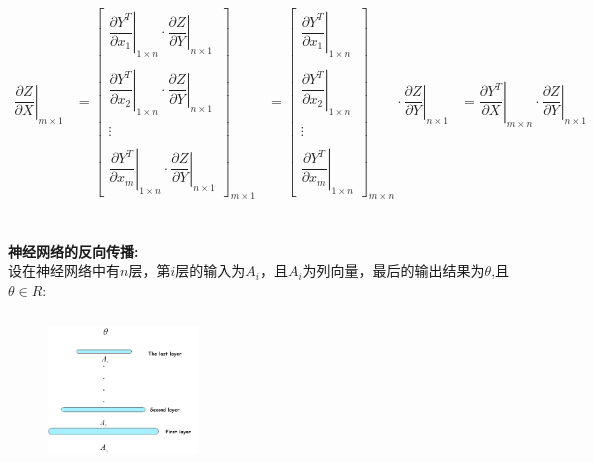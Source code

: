 \documentclass[withoutpreface,bwprint]{cumcmthesis} %
\begin{document}
	\begin{align*}
		\left. \dfrac{\partial Z}{\partial X} \right|_{m{\times}1}
		&=
		\left[
		\begin{array}{c}
			\left. \dfrac{\partial Y^T}{\partial x_1} \right|_{1{\times}n} 
			\cdot
			\left. \dfrac{\partial Z}{\partial Y} \right|_{n{\times}1}
			\\\\
			\left. \dfrac{\partial Y^T}{\partial x_2} \right|_{1{\times}n} 
			\cdot
			\left. \dfrac{\partial Z}{\partial Y} \right|_{n{\times}1}
			\\\\
			\vdots \\\\
			\left. \dfrac{\partial Y^T}{\partial x_m} \right|_{1{\times}n} 
			\cdot
			\left. \dfrac{\partial Z}{\partial Y} \right|_{n{\times}1}
		\end{array}
		\right]_{m{\times}1}	
		&=
		\left[
		\begin{array}{c}
			\left. \dfrac{\partial Y^T}{\partial x_1} \right|_{1{\times}n} 
			\\\\
			\left. \dfrac{\partial Y^T}{\partial x_2} \right|_{1{\times}n} 
			\\\\
			\vdots \\\\
			\left. \dfrac{\partial Y^T}{\partial x_m} \right|_{1{\times}n} 
		\end{array}
		\right]_{m{\times}n}
		\cdot
		 \left. \dfrac{\partial Z}{\partial Y} \right|_{n{\times}1}
		&=\left. \dfrac{\partial Y^T}{\partial X} \right|_{m{\times}n} \cdot \left. \dfrac{\partial Z}{\partial Y} \right|_{n{\times}1}
	\end{align*}\\\\
	\textbf{神经网络的反向传播:}\\
	设在神经网络中有$n$层，第$i$层的输入为$A_i$，且$A_i$为列向量，最后的输出结果为$\theta$,且$\theta \in R$:
	\begin{figure}[h]
		\centering
		\includegraphics[width=4cm,height=4.0cm]{Figures/new.png}
	\end{figure}\\
\end{document}
